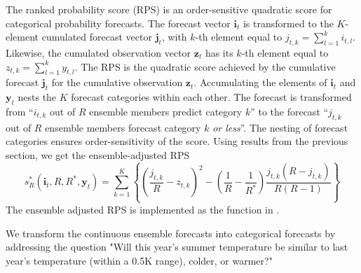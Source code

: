 \documentclass[article]{jss}
\begin{document}
The ranked probability score (RPS) is an order-sensitive quadratic score for categorical probability forecasts.
The forecast vector $\mathbf{i}_t$ is transformed to the $K$-element cumulated forecast vector $\mathbf{j}_t$, with $k$-th element equal to $j_{t,k} = \sum_{l=1}^k i_{t,l}$.
Likewise, the cumulated observation vector $\mathbf{z}_t$ has its $k$-th element equal to $z_{t,k} = \sum_{l=1}^k y_{t,l}$.
The RPS is the quadratic score achieved by the cumulative forecast $\mathbf{j}_t$ for the cumulative observation $\mathbf{z}_t$.
Accumulating the elements of $\mathbf{i}_t$ and $\mathbf{y}_t$ nests the $K$ forecast categories within each other. 
The forecast is transformed from ``$i_{t,k}$ out of $R$ ensemble members predict category $k$'' to the forecast ``$j_{t,k}$ out of $R$ ensemble members forecast category $k$ \emph{or less}''.
The nesting of forecast categories ensures order-sensitivity of the score.
Using results from the previous section, we get the ensemble-adjusted RPS
%
\begin{equation}
s_{R}^*(\mathbf{i}_t, R, R^*, \mathbf{y}_t) = \sum_{k=1}^K \left\{ \left(\frac{j_{t,k}}{R} - z_{t,k}\right)^2 - \left(\frac{1}{R} - \frac{1}{R^*}\right) \frac{j_{t,k}(R-j_{t,k})}{R(R-1)}\right\}
\end{equation}
%
The ensemble adjusted RPS is implemented as the function  in .



We transform the continuous ensemble forecasts into categorical forecasts by addressing the question "Will this year's summer temperature be similar to last year's temperature (within a 0.5K range), colder, or warmer?"
\end{document}
